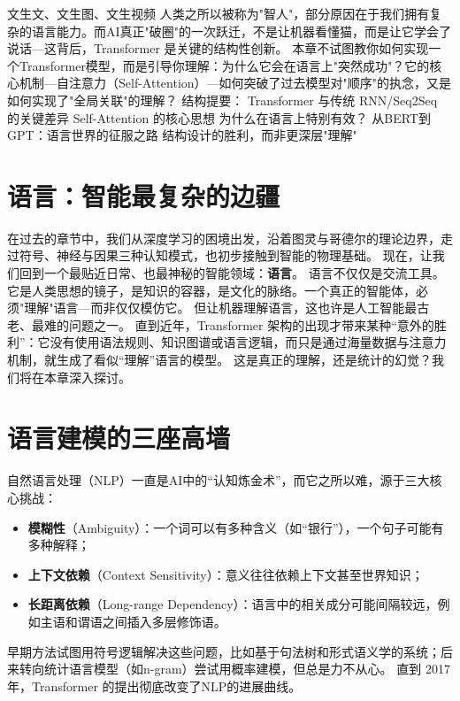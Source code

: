 %
%
文生文、文生图、文生视频
人类之所以被称为"智人"，部分原因在于我们拥有复杂的语言能力。而AI真正"破圈"的一次跃迁，不是让机器看懂猫，而是让它学会了说话---这背后，Transformer 是关键的结构性创新。
本章不试图教你如何实现一个Transformer模型，而是引导你理解：为什么它会在语言上"突然成功"？它的核心机制---自注意力（Self-Attention）---如何突破了过去模型对"顺序"的执念，又是如何实现了"全局关联"的理解？
结构提要：
Transformer 与传统 RNN/Seq2Seq 的关键差异
Self-Attention 的核心思想
为什么在语言上特别有效？
从BERT到GPT：语言世界的征服之路
结构设计的胜利，而非更深层"理解"
\section*{语言：智能最复杂的边疆}
在过去的章节中，我们从深度学习的困境出发，沿着图灵与哥德尔的理论边界，走过符号、神经与因果三种认知模式，也初步接触到智能的物理基础。
现在，让我们回到一个最贴近日常、也最神秘的智能领域：\textbf{语言}。
语言不仅仅是交流工具。它是人类思想的镜子，是知识的容器，是文化的脉络。一个真正的智能体，必须"理解"语言---而非仅仅模仿它。
但让机器理解语言，这也许是人工智能最古老、最难的问题之一。
直到近年，Transformer 架构的出现才带来某种“意外的胜利”：它没有使用语法规则、知识图谱或语言逻辑，而只是通过海量数据与注意力机制，就生成了看似“理解”语言的模型。
这是真正的理解，还是统计的幻觉？我们将在本章深入探讨。
\section*{语言建模的三座高墙}
自然语言处理（NLP）一直是AI中的“认知炼金术”，而它之所以难，源于三大核心挑战：
\begin{itemize}
\item \textbf{模糊性}（Ambiguity）：一个词可以有多种含义（如“银行”），一个句子可能有多种解释；
\item \textbf{上下文依赖}（Context Sensitivity）：意义往往依赖上下文甚至世界知识；
\item \textbf{长距离依赖}（Long-range Dependency）：语言中的相关成分可能间隔较远，例如主语和谓语之间插入多层修饰语。
\end{itemize}
早期方法试图用符号逻辑解决这些问题，比如基于句法树和形式语义学的系统；后来转向统计语言模型（如n-gram）尝试用概率建模，但总是力不从心。
直到 2017 年，Transformer 的提出彻底改变了NLP的进展曲线。
